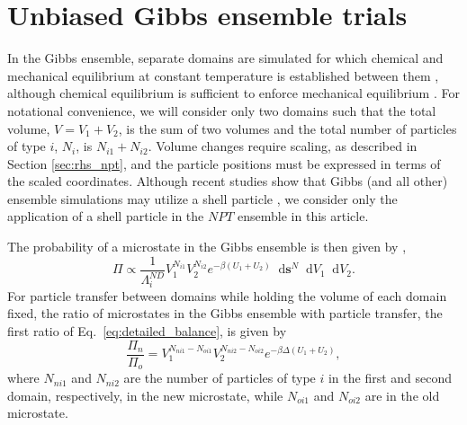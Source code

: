 \documentclass[
  9pt,
  bestpractices,
]{livecoms}
\newcommand*\diff{\mathop{}\!\mathrm{d}}
\begin{document}
\begin{figure}

\end{figure}

\section{\label{sec:rhs_gibbs}Unbiased Gibbs ensemble trials}

In the Gibbs ensemble, separate domains are simulated for which chemical and mechanical equilibrium at constant temperature is established between them \cite{panagiotopoulos_direct_1987}, although chemical equilibrium is sufficient to enforce mechanical equilibrium \cite{panagiotopoulos_adsorption_1987}.
For notational convenience, we will consider only two domains such that the total volume, $V=V_1+V_2$, is the sum of two volumes and the total number of particles of type $i$, $N_i$, is $N_{i1} + N_{i2}$.
Volume changes require scaling, as described in Section \ref{sec:rhs_npt}, and the particle positions must be expressed in terms of the scaled coordinates.
Although recent studies show that Gibbs (and all other) ensemble simulations may utilize a shell particle \cite{hatch_theory_2024}, we consider only the application of a shell particle in the $NPT$ ensemble in this article.

The probability of a microstate in the Gibbs ensemble is then given by \cite{panagiotopoulos_direct_1987, frenkel_understanding_2002, hatch_theory_2024},
\begin{equation}
\Pi \propto \frac{1}{\Lambda_i^{ND}}V_1^{N_{i1}}V_2^{N_{i2}} e^{-\beta (U_1+U_2)} \diff\mathbf{s}^{N} \diff V_1 \diff V_2.
\label{eq:rhs_gibbs_pi}
\end{equation}
For particle transfer between domains while holding the volume of each domain fixed, the ratio of microstates in the Gibbs ensemble with particle transfer, the first ratio of Eq.~\ref{eq:detailed_balance}, is given by
\begin{equation}
\frac{\Pi_{n}}{\Pi_{o}} = V_1^{N_{ni1}-N_{oi1}} V_2^{N_{ni2}-N_{oi2}}e^{-\beta\Delta (U_1+U_2)},
\label{eq:rhs_gibbs_particle}
\end{equation}
where $N_{ni1}$ and $N_{ni2}$ are the number of particles of type $i$ in the first and second domain, respectively, in the new microstate, while $N_{oi1}$ and $N_{oi2}$ are in the old microstate.
\end{document}
